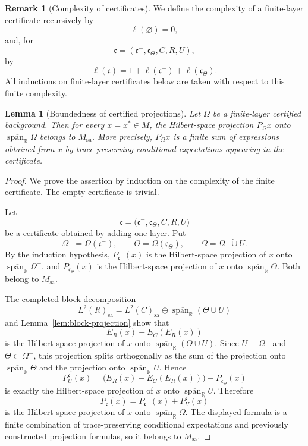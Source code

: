 \documentclass[11pt,letterpaper,reqno]{amsart}
\newtheorem{lem}[thm]{Lemma}
\theoremstyle{definition}
\newtheorem{rem}[thm]{Remark}
\numberwithin{equation}{section}
\newcommand{\sa}{\mathrm{sa}}
\newcommand{\RR}{\mathbb R}
\DeclareMathOperator{\spanop}{span}
\begin{document}
\begin{rem}[Complexity of certificates]\label{rem:certificate-complexity}
We define the complexity of a finite-layer certificate recursively by
\[
   \ell(\varnothing)=0,
\]
and, for
\[
   \mathfrak c=(\mathfrak c^-,\mathfrak c_\Theta,C,R,U),
\]
by
\[
   \ell(\mathfrak c)
   =
   1+\ell(\mathfrak c^-)+\ell(\mathfrak c_\Theta).
\]
All inductions on finite-layer certificates below are taken with respect to
this finite complexity.
\end{rem}

\begin{lem}[Boundedness of certified projections]\label{lem:certified-projection}
Let $\Omega$ be a finite-layer certified background.  Then for every $x=x^*\in M$, the Hilbert-space projection $P_\Omega x$ onto $\overline{\spanop_{\RR}}\Omega$ belongs to $M_{\sa}$.  More precisely, $P_\Omega x$ is a finite sum of expressions obtained from $x$ by trace-preserving conditional expectations appearing in the certificate.
\end{lem}

\begin{proof}
We prove the assertion by induction on the complexity of the finite certificate.
The empty certificate is trivial.

Let
\[
   \mathfrak c=
   \bigl(\mathfrak c^-,\mathfrak c_\Theta,C,R,U\bigr)
\]
be a certificate obtained by adding one layer.  Put
\[
   \Omega^-=\Omega(\mathfrak c^-),
   \qquad
   \Theta=\Omega(\mathfrak c_\Theta),
   \qquad
   \Omega=\Omega^-\dot\cup U.
\]
By the induction hypothesis, $P_{\mathfrak c^-}(x)$ is the Hilbert-space
projection of $x$ onto $\overline{\spanop_{\RR}}\Omega^-$, and
$P_{\mathfrak c_\Theta}(x)$ is the Hilbert-space projection of $x$ onto
$\overline{\spanop_{\RR}}\Theta$.  Both belong to $M_{\sa}$.

The completed-block decomposition
\[
   L^2(R)_{\sa}
   =
   L^2(C)_{\sa}\oplus
   \overline{\spanop_{\RR}}(\Theta\cup U)
\]
and Lemma~\ref{lem:block-projection} show that
\[
   E_R(x)-E_C(E_R(x))
\]
is the Hilbert-space projection of $x$ onto
$\overline{\spanop_{\RR}}(\Theta\cup U)$.  Since $U\perp\Omega^-$ and
$\Theta\subset\Omega^-$, this projection splits orthogonally as the sum of
the projection onto $\overline{\spanop_{\RR}}\Theta$ and the projection onto
$\overline{\spanop_{\RR}}U$.  Hence
\[
   P_U^{\mathfrak c}(x)
   =
   \bigl(E_R(x)-E_C(E_R(x))\bigr)-P_{\mathfrak c_\Theta}(x)
\]
is exactly the Hilbert-space projection of $x$ onto
$\overline{\spanop_{\RR}}U$.  Therefore
\[
   P_{\mathfrak c}(x)
   =
   P_{\mathfrak c^-}(x)+P_U^{\mathfrak c}(x)
\]
is the Hilbert-space projection of $x$ onto
$\overline{\spanop_{\RR}}\Omega$.  The displayed formula is a finite
combination of trace-preserving conditional expectations and previously
constructed projection formulas, so it belongs to $M_{\sa}$.
\end{proof}
\end{document}
